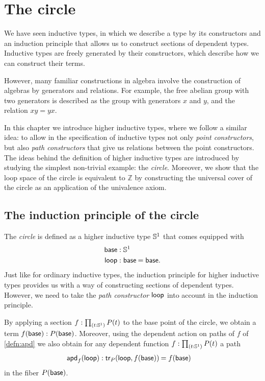 
\chapter{The circle}

We have seen inductive types, in which we describe a type by its constructors and an induction principle that allows us to construct sections of dependent types. Inductive types are freely generated by their constructors, which describe how we can construct their terms. 

However, many familiar constructions in algebra involve the construction of algebras by generators and relations. 
For example, the free abelian group with two generators is described as the group with generators $x$ and $y$, and the relation $xy=yx$. 

In this chapter we introduce higher inductive types, where we follow a similar idea: to allow in the specification of inductive types not only \emph{point constructors}, but also \emph{path constructors} that give us relations between the point constructors. 
The ideas behind the definition of higher inductive types are introduced by studying the simplest non-trivial example: the \emph{circle}.
Moreover, we show that the loop space of the circle is equivalent to $\mathbb{Z}$ by constructing the universal cover of the circle as an application of the univalence axiom. 

\section{The induction principle of the circle}
The \emph{circle} is defined as a higher inductive type $\mathbb{S}^{1}$ that comes equipped with
\begin{align*}
\base & : \sphere{1} \\
\lloop & : \id{\base}{\base}.
\end{align*}
Just like for ordinary inductive types, the induction principle for higher inductive types provides us with a way of constructing sections of dependent types. However, we need to take the \emph{path constructor} $\mathsf{loop}$ into account in the induction principle. 

By applying a section $f:\prd{t:\sphere{1}}P(t)$ to the base point of the circle, we obtain a term $f(\mathsf{base}):P(\mathsf{base})$. Moreover, using the dependent action on paths of $f$ of \autoref{defn:apd} we also obtain for any dependent function $f:\prd{t:\sphere{1}}P(t)$ a path
\begin{align*}
\apd{f}{\lloop} & : \id{\mathsf{tr}_P(\lloop,f(\base))}{f(\base)}
\end{align*}
in the fiber $P(\mathsf{base})$.

